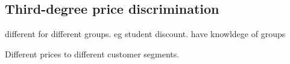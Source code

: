 
\subsection{Third-degree price discrimination}

different for different groups. eg student discount. have knowldege of groups

Different prices to different customer segments.

